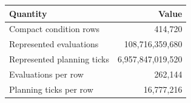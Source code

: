 \begin{tabular}{lr}
\toprule
Quantity & Value \\
\midrule
Compact condition rows & 414,720 \\
Represented evaluations & 108,716,359,680 \\
Represented planning ticks & 6,957,847,019,520 \\
Evaluations per row & 262,144 \\
Planning ticks per row & 16,777,216 \\
\bottomrule
\end{tabular}
